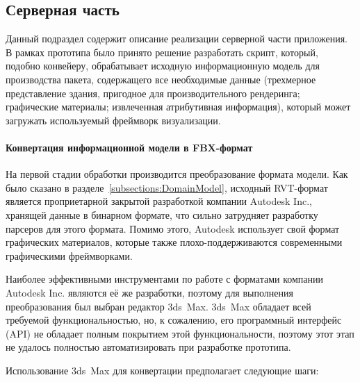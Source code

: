 ﻿\subsection{Серверная часть}
\label{subsections:ServerImpl}

Данный подраздел содержит описание реализации серверной части приложения.
В рамках прототипа было принято решение разработать скрипт,
который, подобно конвейеру, обрабатывает исходную информационную модель
для производства пакета, содержащего все необходимые данные
(трехмерное представление здания, пригодное для производительного рендеринга;
графические материалы; извлеченная атрибутивная информация),
который может загружать используемый фреймворк визуализации.

\paragraph{Конвертация информационной модели в FBX-формат}

На первой стадии обработки производится преобразование формата модели.
Как было сказано в разделе~\ref{subsections:DomainModel},
исходный RVT-формат является проприетарной закрытой разработкой
компании Autodesk Inc., хранящей данные в бинарном формате,
что сильно затрудняет разработку парсеров для этого формата.
Помимо этого, Autodesk использует свой формат графических материалов,
которые также плохо-поддерживаются современными графическими фреймворками.

Наиболее эффективными инструментами по работе с форматами
ком\-па\-нии Auto\-desk Inc. являются её же разработки,
поэтому для выполнения преобразования был выбран редактор 3ds~Max.
3ds~Max обладает всей требуемой функциональностью, но, к сожалению,
его программный интерфейс (API) не обладает полным покрытием этой функциональности,
поэтому этот этап не удалось полностью автоматизировать при разработке прототипа.

Использование 3ds~Max для конвертации предполагает следующие шаги:

